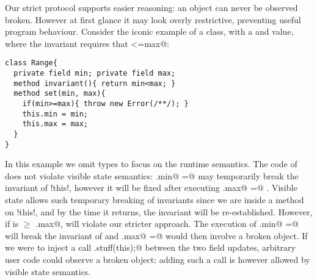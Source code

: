 Our strict protocol supports easier reasoning: an object can never be observed broken. However 
at first glance it may look overly restrictive, preventing useful program behaviour.
Consider the iconic example of a \Q@Range@ class, with a \Q@min@ and \Q@max@
value, where the invariant requires that \Q@min<=max@:
\begin{lstlisting}
class Range{ 
  private field min; private field max;
  method invariant(){ return min<max; }
  method set(min, max){
    if(min>=max){ throw new Error(/**/); }
    this.min = min;
    this.max = max;
  }
}
\end{lstlisting}
In this example we omit types to focus on the runtime semantics.
The code of \Q@set@ does not violate visible state semantics:
\Q@this.min@ \Q@=@ \Q@min@ may temporarily break the invariant of \Q!this!, however it will be fixed after executing \Q@this.max@ \Q@=@ \Q@max@. Visible state allows such temporary breaking of invariants since we are inside a method on \Q!this!, and by the time it returns, the invariant will be re-established.
However, if \Q@min@ is $\geq$ \Q@this.max@, \Q@set@ will violate our stricter approach. The execution of
\Q@this.min@ \Q@=@ \Q@min@ will break the invariant of \Q@this@ and \Q@this.max@ \Q@=@ \Q@max@ would then involve a broken object. If we were to inject a call
\Q@Do.stuff(this);@ between the two field updates, arbitrary user code could observe a broken object; 
  adding such a call is however allowed by visible state semantics.

